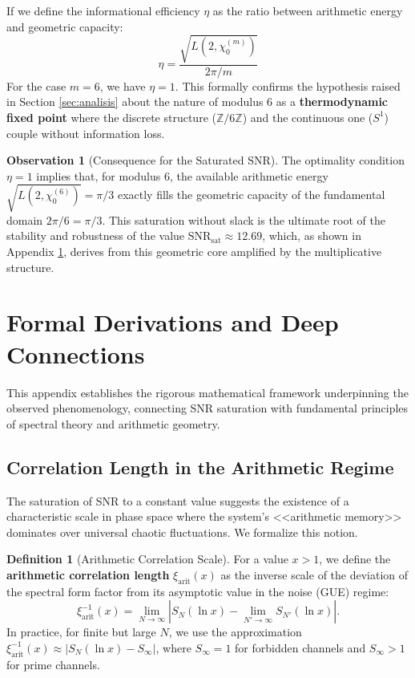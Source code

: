 \documentclass[12pt, a4paper]{article}
\theoremstyle{plain}
\theoremstyle{definition}
\newtheorem{definicion}[teorema]{Definition}
\newtheorem{observacion}[teorema]{Observation}
\theoremstyle{remark}
\begin{document}
If we define the informational efficiency $\eta$ as the ratio between arithmetic energy and geometric capacity:
\[
\eta = \frac{\sqrt{L(2, \chi_0^{(m)})}}{2\pi / m}
\]
For the case $m=6$, we have $\eta = 1$. This formally confirms the hypothesis raised in Section \ref{sec:analisis} about the nature of modulus 6 as a \textbf{thermodynamic fixed point} where the discrete structure ($\mathbb{Z}/6\mathbb{Z}$) and the continuous one ($S^1$) couple without information loss.

\begin{observacion}[Consequence for the Saturated SNR]
The optimality condition $\eta = 1$ implies that, for modulus 6, the available arithmetic energy $\sqrt{L(2,\chi_0^{(6)})} = \pi/3$ exactly fills the geometric capacity of the fundamental domain $2\pi/6 = \pi/3$. This saturation without slack is the ultimate root of the stability and robustness of the value $\mathrm{SNR}_{\mathrm{sat}} \approx 12.69$, which, as shown in Appendix \ref{ap:derivaciones_formales}, derives from this geometric core amplified by the multiplicative structure.
\end{observacion}

\section{Formal Derivations and Deep Connections}
\label{ap:derivaciones_formales}

This appendix establishes the rigorous mathematical framework underpinning the observed phenomenology, connecting SNR saturation with fundamental principles of spectral theory and arithmetic geometry.

\subsection{Correlation Length in the Arithmetic Regime}
\label{ap:longitud_correlacion}

The saturation of SNR to a constant value suggests the existence of a characteristic scale in phase space where the system's <<arithmetic memory>> dominates over universal chaotic fluctuations. We formalize this notion.

\begin{definicion}[Arithmetic Correlation Scale]
For a value $x > 1$, we define the \textbf{arithmetic correlation length} $\xi_{\text{arit}}(x)$ as the inverse scale of the deviation of the spectral form factor from its asymptotic value in the noise (GUE) regime:
\[
\xi_{\text{arit}}^{-1}(x) = \lim_{N \to \infty} \left| S_N(\ln x) - \lim_{N'\to\infty} S_{N'}(\ln x) \right|.
\]
In practice, for finite but large $N$, we use the approximation $\xi_{\text{arit}}^{-1}(x) \approx |S_N(\ln x) - S_{\infty}|$, where $S_{\infty} = 1$ for forbidden channels and $S_{\infty} > 1$ for prime channels.
\end{definicion}
\end{document}
